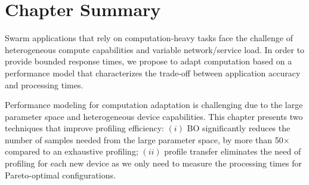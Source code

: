 \section{Chapter Summary}
\label{sec:chap-summary}

Swarm applications that rely on computation-heavy tasks face the challenge of
heterogeneous compute capabilities and variable network/service load. In order
to provide bounded response times, we propose to adapt computation based on a
performance model that characterizes the trade-off between application accuracy
and processing times.

Performance modeling for computation adaptation is challenging due to the large
parameter space and heterogeneous device capabilities. This chapter presents two
techniques that improve profiling efficiency: $(i)$ BO significantly reduces the
number of samples needed from the large parameter space, by more than 50$\times$
compared to an exhaustive profiling; $(ii)$ profile transfer eliminates the need
of profiling for each new device as we only need to measure the processing times
for Pareto-optimal configurations.

